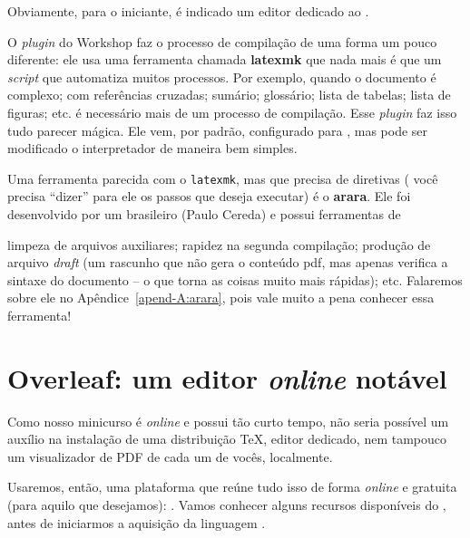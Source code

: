 Obviamente, para o iniciante, é indicado um editor dedicado ao .

O \textit{plugin}  do  Workshop faz o processo de compilação de uma
forma um pouco diferente: ele usa uma ferramenta chamada \textbf{latexmk} que 
nada mais é que um \textit{script} que automatiza muitos processos.
Por exemplo, quando o documento é complexo; com referências cruzadas; sumário; 
glossário; lista de tabelas; lista de figuras; etc. é necessário mais de um processo
de compilação. 
Esse \textit{plugin} faz isso tudo parecer mágica.
Ele vem, por padrão, configurado para \pdflatex, mas pode ser modificado
o interpretador de maneira bem simples.

Uma ferramenta parecida com o \texttt{latexmk}, mas que precisa de diretivas (
você precisa ``dizer'' para ele os passos que deseja executar) é o \textbf{arara}.
Ele foi desenvolvido por um brasileiro (Paulo Cereda) e possui ferramentas de 
limpeza de arquivos auxiliares; rapidez na segunda compilação; produção de arquivo 
\textit{draft} (um rascunho que não gera o conteúdo pdf, mas apenas verifica a 
sintaxe do documento -- o que torna as coisas muito mais rápidas); etc.
Falaremos sobre ele no Apêndice~\ref{apend-A:arara}, pois vale muito a pena 
conhecer essa ferramenta!

\section{Overleaf: um editor \textit{online} notável} %
\label{sec:overleaf}

Como nosso minicurso é \textit{online} e possui tão curto tempo, não seria 
possível um auxílio na instalação de uma distribuição \TeX{}, editor dedicado, 
nem tampouco um visualizador de PDF de cada um de vocês, localmente.

Usaremos, então, uma plataforma que reúne tudo isso de forma \textit{online} e 
gratuita (para aquilo que desejamos): \Overleaf.
Vamos conhecer alguns recursos disponíveis do \Overleaf, antes de iniciarmos a
aquisição da linguagem .

